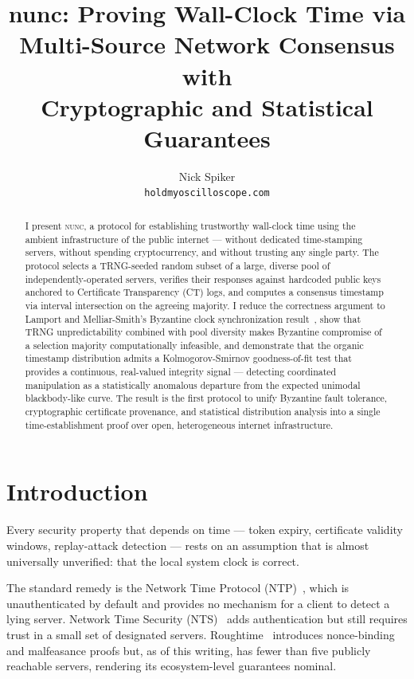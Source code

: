 \documentclass[11pt,twocolumn]{article}
\title{\textbf{nunc}: Proving Wall-Clock Time via\\
Multi-Source Network Consensus with\\
Cryptographic and Statistical Guarantees}
\author{
  Nick Spiker \\
  \texttt{holdmyoscilloscope.com}
}
\date{}
\begin{document}
\raggedright

\maketitle

\begin{abstract}
I present \textsc{nunc}, a protocol for establishing trustworthy wall-clock
time using the ambient infrastructure of the public internet — without
dedicated time-stamping servers, without spending cryptocurrency, and without
trusting any single party.  The protocol selects a TRNG-seeded random subset
of a large, diverse pool of independently-operated servers, verifies their
responses against hardcoded public keys anchored to Certificate Transparency
(CT) logs, and computes a consensus timestamp via interval intersection on the
agreeing majority.  I reduce the correctness argument to Lamport and
Melliar-Smith's Byzantine clock synchronization result~\cite{lamport1984}, show
that TRNG unpredictability combined with pool diversity makes Byzantine
compromise of a selection majority computationally infeasible, and demonstrate
that the organic timestamp distribution admits a Kolmogorov-Smirnov
goodness-of-fit test that provides a continuous, real-valued integrity signal —
detecting coordinated manipulation as a statistically anomalous departure from
the expected unimodal blackbody-like curve.  The result is the first protocol
to unify Byzantine fault tolerance, cryptographic certificate provenance, and
statistical distribution analysis into a single time-establishment proof over
open, heterogeneous internet infrastructure.
\end{abstract}

\section{Introduction}

Every security property that depends on time --- token expiry, certificate
validity windows, replay-attack detection --- rests on an assumption that is
almost universally unverified: that the local system clock is correct.

The standard remedy is the Network Time Protocol (NTP)~\cite{rfc5905}, which
is unauthenticated by default and provides no mechanism for a client to detect
a lying server.  Network Time Security (NTS)~\cite{rfc8915} adds
authentication but still requires trust in a small set of designated servers.
Roughtime~\cite{roughtime} introduces nonce-binding and malfeasance proofs but,
as of this writing, has fewer than five publicly reachable servers, rendering
its ecosystem-level guarantees nominal.
\end{document}
